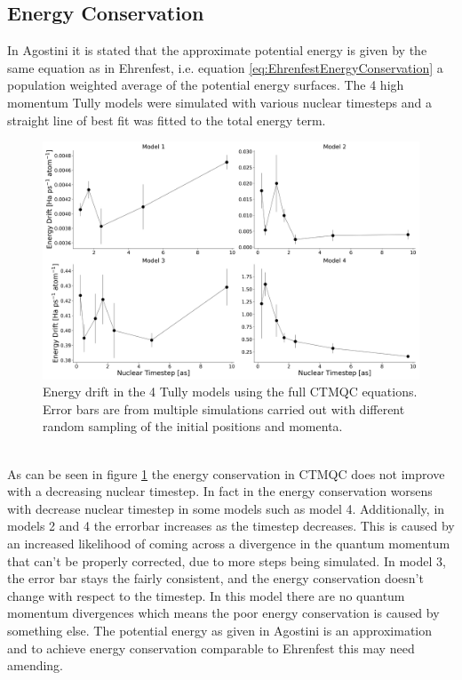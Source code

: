 \subsection{Energy Conservation}
In Agostini \cite{agostini_quantum-classical_2016} it is stated that the approximate potential energy is given by the same equation as in Ehrenfest, i.e. equation \eqref{eq:EhrenfestEnergyConservation} a population weighted average of the potential energy surfaces. The 4 high momentum Tully models were simulated with various nuclear timesteps and a straight line of best fit was fitted to the total energy term.
\begin{figure}[ht]
  \includegraphics[width=\textwidth]{../img/CTMQC/TullyModels/CTMQC_EnerCons.png}
  \caption{\label{fig:CTMQC_EnergyCons}Energy drift in the 4 Tully models using the full CTMQC equations. Error bars are from multiple simulations carried out with different random sampling of the initial positions and momenta.}
\end{figure}
\\
As can be seen in figure \ref{fig:CTMQC_EnergyCons} the energy conservation in CTMQC does not improve with a decreasing nuclear timestep. In fact in the energy conservation worsens with decrease nuclear timestep in some models such as model 4. Additionally, in models 2 and 4 the errorbar increases as the timestep decreases. This is caused by an increased likelihood of coming across a divergence in the quantum momentum that can't be properly corrected, due to more steps being simulated. In model 3, the error bar stays the fairly consistent, and the energy conservation doesn't change with respect to the timestep. In this model there are no quantum momentum divergences which means the poor energy conservation is caused by something else. The potential energy as given in Agostini \cite{agostini_quantum-classical_2016} is an approximation and to achieve energy conservation comparable to Ehrenfest this may need amending.

